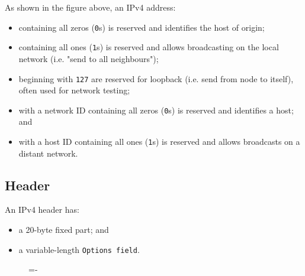 \documentclass[a4paper]{systems-software}
\begin{document}
As shown in the figure above, an IPv4 address:
\begin{itemize}
	\item containing all zeros (\texttt{0}s) is reserved and identifies the host of origin;
	\item containing all ones (\texttt{1}s) is reserved and allows broadcasting on the local network (i.e. "send to all neighbours");
	\item beginning with \texttt{127} are reserved for loopback (i.e. send from node to itself), often used for network testing;
	\item with a network ID containing all zeros (\texttt{0}s) is reserved and identifies a host; and
	\item with a host ID containing all ones (\texttt{1}s) is reserved and allows broadcasts on a distant network.
\end{itemize}


\subsection*{Header}

An IPv4 header has:
\begin{itemize}
	\item a 20-byte fixed part; and
	\item a variable-length \texttt{Options field}.
\end{itemize}

\begin{figure}[H]
	\lineskip=-\fboxrule
\end{figure}
\end{document}
